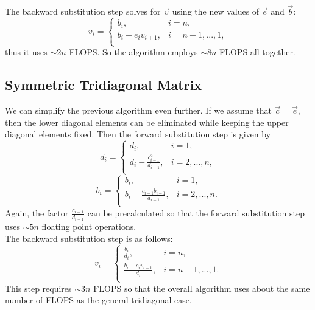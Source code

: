 \documentclass[prb,aps,twocolumn,showpacs,10pt]{revtex4-1}
\begin{document}
The backward substitution step solves for $\vec{v}$ using the new values of $\vec{e}$ and $\vec{b}$:
\begin{equation}
v_i = \begin{cases} 
      b_i, &i=n,\\
      b_i-e_i v_{i+1}, &i=n-1,...,1,\\
   \end{cases}
\end{equation}
thus it uses $\sim 2n$ FLOPS. So the algorithm employs $\sim 8n$ FLOPS all together. 

\subsection{Symmetric Tridiagonal Matrix}

We can simplify the previous algorithm even further. If we assume that $\vec{c}=\vec{e}$, then the lower diagonal elements can be eliminated while keeping the upper diagonal elements fixed. Then the forward substitution step is given by
\begin{equation}
d_i = \begin{cases} 
      d_i, &i=1,\\
      d_i-\frac{c_{i-1}^2}{d_{i-1}}, &i=2,...,n,\\
   \end{cases}
\end{equation}
\begin{equation}
b_i = \begin{cases} 
      b_i, &i=1,\\
      b_i-\frac{c_{i-1}b_{i-1}}{d_{i-1}}, &i=2,...,n.\\
   \end{cases}
\end{equation}
Again, the factor $\frac{c_{i-1}}{d_{i-1}}$ can be precalculated so that the forward substitution step uses $\sim 5n$ floating point operations. \\

The backward substitution step is as follows:
\begin{equation}
v_i = \begin{cases} 
      \frac{b_i}{d_i}, &i=n,\\
      \frac{b_i-c_iv_{i+1}}{d_i}, &i=n-1,...,1.\\
   \end{cases}
\end{equation}
This step requires $\sim 3n$ FLOPS so that the overall algorithm uses about the same number of FLOPS as the general tridiagonal case. 
\end{document}

